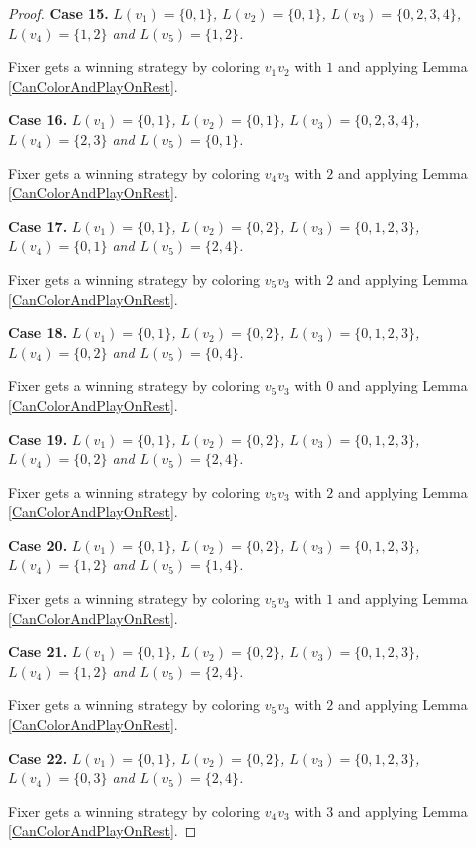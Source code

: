 \documentclass[12pt]{amsart}
\theoremstyle{plain}
\theoremstyle{definition}
\theoremstyle{remark}
\begin{document}
\begin{proof}
\noindent\textbf{Case 15.  }\textit{$L(v_1) = \{0, 1\}$, $L(v_2) = \{0, 1\}$, $L(v_3) = \{0, 2, 3, 4\}$, $L(v_4) = \{1, 2\}$ and $L(v_5) = \{1, 2\}$.}

Fixer gets a winning strategy by coloring $v_1v_2$ with $1$ and applying Lemma \ref{CanColorAndPlayOnRest}.

\noindent\textbf{Case 16.  }\textit{$L(v_1) = \{0, 1\}$, $L(v_2) = \{0, 1\}$, $L(v_3) = \{0, 2, 3, 4\}$, $L(v_4) = \{2, 3\}$ and $L(v_5) = \{0, 1\}$.}

Fixer gets a winning strategy by coloring $v_4v_3$ with $2$ and applying Lemma \ref{CanColorAndPlayOnRest}.

\noindent\textbf{Case 17.  }\textit{$L(v_1) = \{0, 1\}$, $L(v_2) = \{0, 2\}$, $L(v_3) = \{0, 1, 2, 3\}$, $L(v_4) = \{0, 1\}$ and $L(v_5) = \{2, 4\}$.}

Fixer gets a winning strategy by coloring $v_5v_3$ with $2$ and applying Lemma \ref{CanColorAndPlayOnRest}.

\noindent\textbf{Case 18.  }\textit{$L(v_1) = \{0, 1\}$, $L(v_2) = \{0, 2\}$, $L(v_3) = \{0, 1, 2, 3\}$, $L(v_4) = \{0, 2\}$ and $L(v_5) = \{0, 4\}$.}

Fixer gets a winning strategy by coloring $v_5v_3$ with $0$ and applying Lemma \ref{CanColorAndPlayOnRest}.

\noindent\textbf{Case 19.  }\textit{$L(v_1) = \{0, 1\}$, $L(v_2) = \{0, 2\}$, $L(v_3) = \{0, 1, 2, 3\}$, $L(v_4) = \{0, 2\}$ and $L(v_5) = \{2, 4\}$.}

Fixer gets a winning strategy by coloring $v_5v_3$ with $2$ and applying Lemma \ref{CanColorAndPlayOnRest}.

\noindent\textbf{Case 20.  }\textit{$L(v_1) = \{0, 1\}$, $L(v_2) = \{0, 2\}$, $L(v_3) = \{0, 1, 2, 3\}$, $L(v_4) = \{1, 2\}$ and $L(v_5) = \{1, 4\}$.}

Fixer gets a winning strategy by coloring $v_5v_3$ with $1$ and applying Lemma \ref{CanColorAndPlayOnRest}.

\noindent\textbf{Case 21.  }\textit{$L(v_1) = \{0, 1\}$, $L(v_2) = \{0, 2\}$, $L(v_3) = \{0, 1, 2, 3\}$, $L(v_4) = \{1, 2\}$ and $L(v_5) = \{2, 4\}$.}

Fixer gets a winning strategy by coloring $v_5v_3$ with $2$ and applying Lemma \ref{CanColorAndPlayOnRest}.

\noindent\textbf{Case 22.  }\textit{$L(v_1) = \{0, 1\}$, $L(v_2) = \{0, 2\}$, $L(v_3) = \{0, 1, 2, 3\}$, $L(v_4) = \{0, 3\}$ and $L(v_5) = \{2, 4\}$.}

Fixer gets a winning strategy by coloring $v_4v_3$ with $3$ and applying Lemma \ref{CanColorAndPlayOnRest}.


\end{proof}
\end{document}
